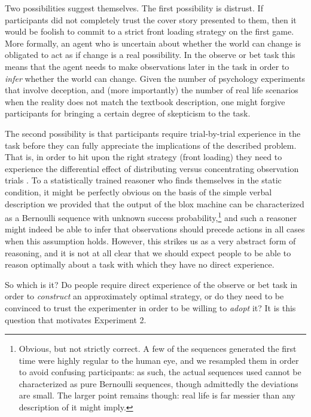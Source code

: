 \documentclass[authoryear]{elsarticle}
\begin{document}
Two possibilities suggest themselves. The first possibility is distrust. If participants did not completely trust the cover story presented to them, then it would be foolish to commit to a strict front loading strategy on the first game. More formally, an agent who is uncertain about whether the world can change is obligated to act as if change is a real possibility. In the observe or bet task this means that the agent needs to make observations later in the task in order to {\it infer} whether the world can change. Given the number of psychology experiments that involve deception, and (more importantly) the number of real life scenarios when the reality does not match the textbook description, one might forgive participants for bringing a certain degree of skepticism to the task.

The second possibility is that participants require trial-by-trial experience in the task before they can fully appreciate the implications of the described problem. That is, in order to hit upon the right strategy (front loading) they need to experience the differential effect of distributing versus concentrating observation trials \citep[e.g.,][]{newell_role_2007,newell_probability_2013}. To a statistically trained reasoner who finds themselves in the static condition, it might be perfectly obvious on the basis of the simple verbal description we provided that the output of the blox machine can be characterized as a Bernoulli sequence with unknown success probability,\footnote{Obvious, but not strictly correct. A few of the sequences generated the first time were highly regular to the human eye, and we resampled them in order to avoid confusing participants: as such, the actual sequences used cannot be characterized as pure Bernoulli sequences, though admittedly the deviations are small. The larger point remains though: real life is far messier than any description of it might imply.}  and such a reasoner might indeed be able to infer that observations should precede actions in all cases when this assumption holds. However, this strikes us as a very abstract form of reasoning, and it is not at all clear that we should expect people to be able to reason optimally about a task with which they have no direct experience.

So which is it? Do people require direct experience of the observe or bet task in order to {\it construct} an approximately optimal strategy, or do they need to be convinced to trust the experimenter in order to be willing to {\it adopt} it? It is this question that motivates Experiment 2.
\end{document}
